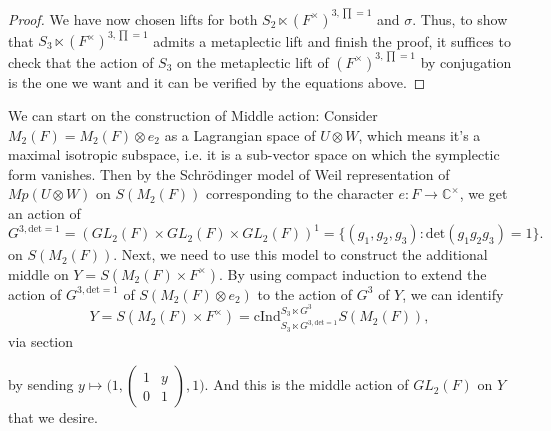 \documentclass[12pt,a4paper,english]{article}
\theoremstyle{plain}
\theoremstyle{definition}
\newcommand{\cInd}{\mathrm{cInd}}
\begin{document}
\begin{proof}
We have now chosen lifts for both $S_{2}\ltimes (F^{\times})^{3,\prod=1}$ and $\sigma$. Thus, to show that $S_{3}\ltimes (F^{\times})^{3,\prod=1}$ admits a metaplectic lift and finish the proof, it suffices to check that the action of $S_{3}$ on the metaplectic lift of $(F^{\times})^{3,\prod=1}$ by conjugation is the one we want and it can be verified by the equations above.
\end{proof}


We can start on the construction of Middle action:
Consider $M_{2}(F)=M_{2}(F)\otimes e_{2}$ as a Lagrangian space of $U\otimes W$, which means it's a maximal isotropic subspace, i.e. it is a sub-vector space on which the symplectic form vanishes. Then by the Schr\"{o}dinger model of Weil representation of $Mp(U\otimes W)$ on $S(M_{2}(F))$ corresponding to the character $e: F\rightarrow \mathbb{C}^{\times}$, we get an action of 
\begin{equation*}
    G^{3,\text{det}=1}=(GL_{2}(F)\times GL_{2}(F)\times GL_{2}(F))^{1}=\{(g_{1}, g_{2}, g_{3}): \text{det}(g_{1} g_{2} g_{3})=1\}.
\end{equation*}
on $S(M_{2}(F))$.
Next, we need to use this model to construct the additional middle on $Y=S(M_{2}(F)\times F^{\times})$. By using compact induction to extend the action of $G^{3,\text{det}=1}$ of $S(M_{2}(F)\otimes e_{2})$ to the action of $G^{3}$ of $Y$, we can identify
\begin{equation*}
    Y=S(M_{2}(F)\times F^{\times})=\cInd^{S_{3}\ltimes G^{3}}_{S_{3}\ltimes G^{3,\text{det}=1}}S(M_{2}(F)),
\end{equation*}
via section 
\begin{center}
\end{center}
by sending $y\mapsto \bigg(1,\begin{pmatrix}
1 &y\\
0&1
\end{pmatrix}, 1\bigg)$. 
And this is the middle action of $GL_{2}(F)$ on $Y$ that we desire. 
\end{document}
